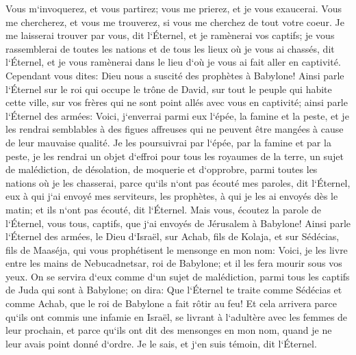 \verse Vous m`invoquerez, et vous partirez; vous me prierez, et je vous exaucerai. 
\verse Vous me chercherez, et vous me trouverez, si vous me cherchez de tout votre coeur. 
\verse Je me laisserai trouver par vous, dit l`Éternel, et je ramènerai vos captifs; je vous rassemblerai de toutes les nations et de tous les lieux où je vous ai chassés, dit l`Éternel, et je vous ramènerai dans le lieu d`où je vous ai fait aller en captivité. 
\verse Cependant vous dites: Dieu nous a suscité des prophètes à Babylone! 
\verse Ainsi parle l`Éternel sur le roi qui occupe le trône de David, sur tout le peuple qui habite cette ville, sur vos frères qui ne sont point allés avec vous en captivité; 
\verse ainsi parle l`Éternel des armées: Voici, j`enverrai parmi eux l`épée, la famine et la peste, et je les rendrai semblables à des figues affreuses qui ne peuvent être mangées à cause de leur mauvaise qualité. 
\verse Je les poursuivrai par l`épée, par la famine et par la peste, je les rendrai un objet d`effroi pour tous les royaumes de la terre, un sujet de malédiction, de désolation, de moquerie et d`opprobre, parmi toutes les nations où je les chasserai, 
\verse parce qu`ils n`ont pas écouté mes paroles, dit l`Éternel, eux à qui j`ai envoyé mes serviteurs, les prophètes, à qui je les ai envoyés dès le matin; et ils n`ont pas écouté, dit l`Éternel. 
\verse Mais vous, écoutez la parole de l`Éternel, vous tous, captifs, que j`ai envoyés de Jérusalem à Babylone! 
\verse Ainsi parle l`Éternel des armées, le Dieu d`Israël, sur Achab, fils de Kolaja, et sur Sédécias, fils de Maaséja, qui vous prophétisent le mensonge en mon nom: Voici, je les livre entre les mains de Nebucadnetsar, roi de Babylone; et il les fera mourir sous vos yeux. 
\verse On se servira d`eux comme d`un sujet de malédiction, parmi tous les captifs de Juda qui sont à Babylone; on dira: Que l`Éternel te traite comme Sédécias et comme Achab, que le roi de Babylone a fait rôtir au feu! 
\verse Et cela arrivera parce qu`ils ont commis une infamie en Israël, se livrant à l`adultère avec les femmes de leur prochain, et parce qu`ils ont dit des mensonges en mon nom, quand je ne leur avais point donné d`ordre. Je le sais, et j`en suis témoin, dit l`Éternel. 
